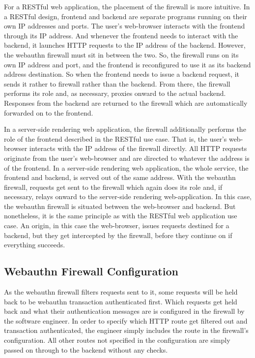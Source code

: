For a RESTful web application, the placement of the firewall is more intuitive. In a RESTful design, frontend and backend are separate programs running on their own IP addresses and ports. The user's web-browser interacts with the frontend through its IP address. And whenever the frontend needs to interact with the backend, it launches HTTP requests to the IP address of the backend. However, the webauthn firewall must sit in between the two. So, the firewall runs on its own IP address and port, and the frontend is reconfigured to use it as its backend address destination. So when the frontend needs to issue a backend request, it sends it rather to firewall rather than the backend. From there, the firewall performs its role and, as necessary, proxies onward to the actual backend. Responses from the backend are returned to the firewall which are automatically forwarded on to the frontend. 


In a server-side rendering web application, the firewall additionally performs the role of the frontend described in the RESTful use case. That is, the user's web-browser interacts with the IP address of the firewall directly. All HTTP requests originate from the user's web-browser and are directed to whatever the address is of the frontend. In a server-side rendering web application, the whole service, the frontend and backend, is served out of the same address. With the webauthn firewall, requests get sent to the firewall which again does its role and, if necessary, relays onward to the server-side rendering web-application. In this case, the webauthn firewall is situated between the web-browser and backend. But nonetheless, it is the same principle as with the RESTful web application use case. An origin, in this case the web-browser, issues requests destined for a backend, but they get intercepted by the firewall, before they continue on if everything succeeds.

\subsection{Webauthn Firewall Configuration}


As the webauthn firewall filters requests sent to it, some requests will be held back to be webauthn transaction authenticated first. Which requests get held back and what their authentication messages are is configured in the firewall by the software engineer. In order to specify which HTTP route get filtered out and transaction authenticated, the engineer simply includes the route in the firewall's configuration. All other routes not specified in the configuration are simply passed on through to the backend without any checks.

